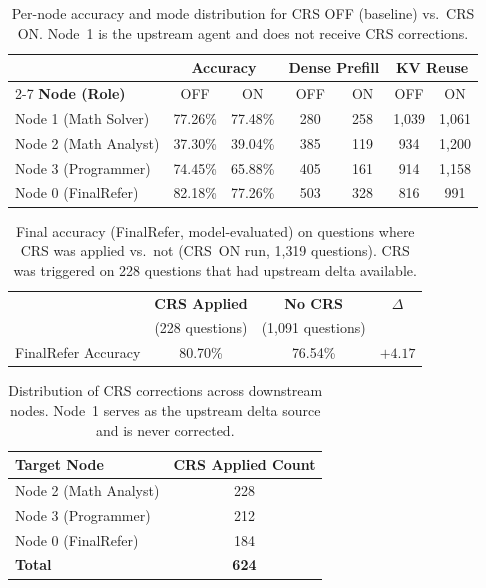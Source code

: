 \begin{table}[t]
\centering
\caption{Per-node accuracy and mode distribution for CRS OFF (baseline) vs.\ CRS ON.
  Node~1 is the upstream agent and does not receive CRS corrections.}
\label{tab:crs-per-node}
\renewcommand{\arraystretch}{1.15}
\begin{tabular}{|l|cc|cc|cc|}
\hline
                     & \multicolumn{2}{c|}{\textbf{Accuracy}} & \multicolumn{2}{c|}{\textbf{Dense Prefill}} & \multicolumn{2}{c}{\textbf{KV Reuse}} \\
\cline{2-7}
\textbf{Node (Role)} & OFF   & ON    & OFF & ON  & OFF & ON \\
\hline\hline
Node 1 (Math Solver)    & 77.26\% & 77.48\% & 280 & 258 & 1{,}039 & 1{,}061 \\
\hline
Node 2 (Math Analyst)   & 37.30\% & 39.04\% & 385 & 119 &   934 & 1{,}200 \\
\hline
Node 3 (Programmer)     & 74.45\% & 65.88\% & 405 & 161 &   914 & 1{,}158 \\
\hline
Node 0 (FinalRefer)     & 82.18\% & 77.26\% & 503 & 328 &   816 &   991 \\
\hline
\end{tabular}
\end{table}

\begin{table}[t]
\centering
\caption{Final accuracy (FinalRefer, model-evaluated) on questions where
  CRS was applied vs.\ not (CRS~ON run, 1{,}319 questions).  CRS was
  triggered on 228 questions that had upstream delta available.}
\label{tab:crs-applied-vs-not}
\renewcommand{\arraystretch}{1.15}
\begin{tabular}{|l|c|c|c|}
\hline
                           & \textbf{CRS Applied}        & \textbf{No CRS}             & \textbf{$\Delta$} \\
                           & (228 questions)              & (1{,}091 questions)         &                   \\
\hline\hline
FinalRefer Accuracy        & 80.70\%                      & 76.54\%                     & $+4.17$           \\
\hline
\end{tabular}
\end{table}

\begin{table}[t]
\centering
\caption{Distribution of CRS corrections across downstream nodes.
  Node~1 serves as the upstream delta source and is never corrected.}
\label{tab:crs-distribution}
\renewcommand{\arraystretch}{1.15}
\begin{tabular}{|l|c|}
\hline
\textbf{Target Node}  & \textbf{CRS Applied Count} \\
\hline\hline
Node 2 (Math Analyst)  & 228 \\
\hline
Node 3 (Programmer)    & 212 \\
\hline
Node 0 (FinalRefer)    & 184 \\
\hline\hline
\textbf{Total}         & \textbf{624} \\
\hline
\end{tabular}
\end{table}
